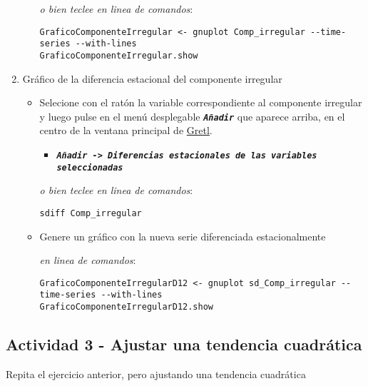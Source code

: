 \documentclass[11pt]{article}
\begin{document}
\begin{enumerate}
\begin{itemize}
{\vspace{1pt} \footnotesize \color{gray!70!black}
\emph{o bien teclee en linea de comandos}:
\begin{verbatim}
GraficoComponenteIrregular <- gnuplot Comp_irregular --time-series --with-lines
GraficoComponenteIrregular.show
\end{verbatim}
}
\end{itemize}

\item Gráfico de la diferencia estacional del componente irregular
\label{sec:org054fb36}

\begin{itemize}
\item Selecione con el ratón la variable correspondiente al componente
irregular y luego pulse en el menú desplegable \textbf{\emph{\texttt{Añadir}}} que
aparece arriba, en el centro de la ventana principal de \href{https://gretl.sourceforge.net/es.html}{Gretl}.
\begin{itemize}
\item \textbf{\emph{\texttt{Añadir -> Diferencias estacionales de las variables
      seleccionadas}}}
\end{itemize}

{\vspace{0pt} \footnotesize \color{gray!70!black}
\emph{o bien teclee en linea de comandos}: 
\begin{verbatim}
sdiff Comp_irregular
\end{verbatim}
}

\item Genere un gráfico con la nueva serie diferenciada estacionalmente

{\vspace{0pt} \footnotesize \color{gray!70!black}
\emph{en linea de comandos}: 
\begin{verbatim}
GraficoComponenteIrregularD12 <- gnuplot sd_Comp_irregular --time-series --with-lines
GraficoComponenteIrregularD12.show
\end{verbatim}
}
\end{itemize}
\end{enumerate}


\subsection{Actividad 3 - Ajustar una tendencia cuadrática}
\label{sec:org2b825ac}

Repita el ejercicio anterior, pero ajustando una tendencia cuadrática
\end{document}
